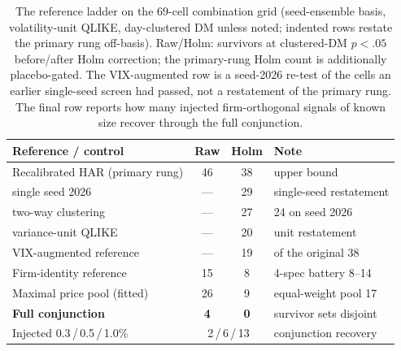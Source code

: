 \begin{table}[tbp]
\centering
\caption[The reference ladder on the 69-cell combination grid]{The reference ladder on the 69-cell combination grid (seed-ensemble basis, volatility-unit QLIKE, day-clustered DM unless noted; indented rows restate the primary rung off-basis). Raw/Holm: survivors at clustered-DM $p<.05$ before/after Holm correction; the primary-rung Holm count is additionally placebo-gated. The VIX-augmented row is a seed-2026 re-test of the cells an earlier single-seed screen had passed, not a restatement of the primary rung. The final row reports how many injected firm-orthogonal signals of known size recover through the full conjunction.}
\label{tab:res-ladder}
\begin{tabular}{@{}lccl@{}}
\toprule
Reference / control & Raw & Holm & Note \\
\midrule
Recalibrated HAR (primary rung)   & 46 & 38 & upper bound \\ %
\quad single seed 2026            & --- & 29 & single-seed restatement \\ %
\quad two-way clustering          & --- & 27 & 24 on seed 2026 \\ %
\quad variance-unit QLIKE         & --- & 20 & unit restatement \\ %
VIX-augmented reference           & --- & 19 & of the original 38 \\ %
Firm-identity reference           & 15 & 8  & 4-spec battery 8--14 \\ %
Maximal price pool (fitted)       & 26 & 9  & equal-weight pool 17 \\ %
\textbf{Full conjunction}         & \textbf{4} & \textbf{0} & survivor sets disjoint \\ %
\midrule
Injected 0.3\,/\,0.5\,/\,1.0\%    & \multicolumn{2}{c}{2\,/\,6\,/\,13} & conjunction recovery \\ %
\bottomrule
\end{tabular}
\end{table}

